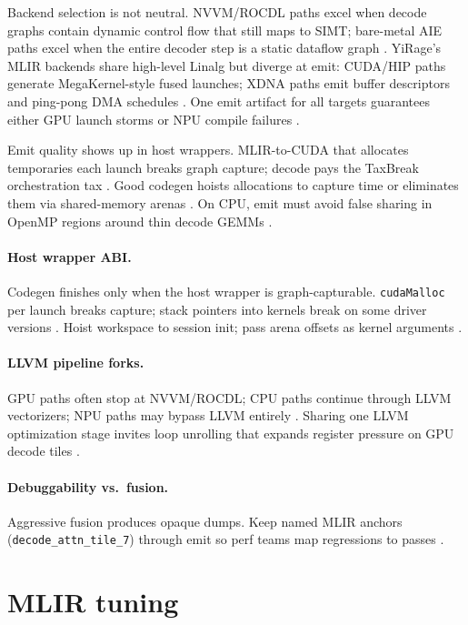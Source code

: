 Backend selection is not neutral. NVVM/ROCDL paths excel when decode graphs contain dynamic control flow that still maps to SIMT; bare-metal AIE paths excel when the entire decoder step is a static dataflow graph \citep{amd2024aie}. YiRage's MLIR backends share high-level Linalg but diverge at emit: CUDA/HIP paths generate MegaKernel-style fused launches; XDNA paths emit buffer descriptors and ping-pong DMA schedules \citep{yirage2026,semianalysis2024tma}. One emit artifact for all targets guarantees either GPU launch storms or NPU compile failures \citep{patel2025llminference}.

Emit quality shows up in host wrappers. MLIR-to-CUDA that allocates temporaries each launch breaks graph capture; decode pays the TaxBreak orchestration tax \citep{taxbreak2026,nvidia2024cudagraphs}. Good codegen hoists allocations to capture time or eliminates them via shared-memory arenas \citep{memoryfloor2026}. On CPU, emit must avoid false sharing in OpenMP regions around thin decode GEMMs \citep{dlbook}.

\paragraph{Host wrapper ABI.} Codegen finishes only when the host wrapper is graph-capturable. \texttt{cudaMalloc} per launch breaks capture; stack pointers into kernels break on some driver versions \citep{nvidia2024cudagraphs,memoryfloor2026}. Hoist workspace to session init; pass arena offsets as kernel arguments \citep{yirage2026}.

\paragraph{LLVM pipeline forks.} GPU paths often stop at NVVM/ROCDL; CPU paths continue through LLVM vectorizers; NPU paths may bypass LLVM entirely \citep{chen2020compilerbasedhardw,amd2024aie}. Sharing one LLVM optimization stage invites loop unrolling that expands register pressure on GPU decode tiles \citep{nvidia2022hopper,liu2024deepseekv3}.

\paragraph{Debuggability vs.\ fusion.} Aggressive fusion produces opaque dumps. Keep named MLIR anchors (\texttt{decode\_attn\_tile\_7}) through emit so perf teams map regressions to passes \citep{yirage2026,taxbreak2026}.

\section{MLIR tuning}

